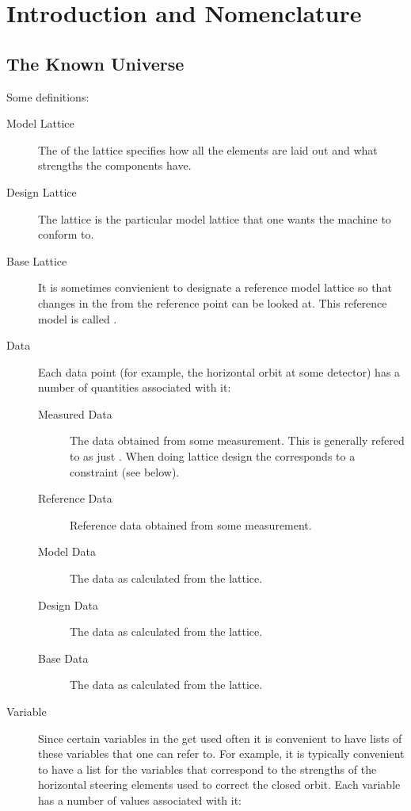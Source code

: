 \chapter{Introduction and Nomenclature}
\label{c:nomenclature}

\section{The Known Universe}

Some definitions:
\begin{description}
\item[Model Lattice]
The  of the lattice specifies how all the elements are laid
out and what strengths the components have.
\item[Design Lattice] 
The  lattice is the particular model lattice that one wants the
machine to conform to.
\item[Base Lattice]
It is sometimes
convienient to designate a reference model lattice so that changes in the
 from the reference point can be looked at.  This reference model
is called .
\item[Data] 
Each data point (for example, the horizontal orbit at some
detector) has a number of quantities associated with it:
\begin{description}
\item[Measured Data] 
The data obtained from some measurement. This is generally refered to
as just . When doing lattice design the  corresponds to
a constraint (see below).
\item[Reference Data] 
Reference data obtained from some measurement.
\item[Model Data]
The data as calculated from the  lattice.
\item[Design Data]
The data as calculated from the  lattice.
\item[Base Data]
The data as calculated from the  lattice.
\end{description}
\item[Variable]
Since certain variables in the  get used often it is
convenient to have lists of these variables that one can refer to. For
example, it is typically convenient to have a list for the variables
that correspond to the strengths of the horizontal steering elements
used to correct the closed orbit.
Each variable has a number of values associated with it:

\end{description}
